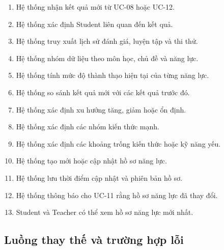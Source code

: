 \begin{enumerate}
	\item Hệ thống nhận kết quả mới từ UC-08 hoặc UC-12.
	
	\item Hệ thống xác định Student liên quan đến kết quả.
	
	\item Hệ thống truy xuất lịch sử đánh giá, luyện tập và thi thử.
	
	\item Hệ thống nhóm dữ liệu theo môn học, chủ đề và năng lực.
	
	\item Hệ thống tính mức độ thành thạo hiện tại của từng năng lực.
	
	\item Hệ thống so sánh kết quả mới với các kết quả trước đó.
	
	\item Hệ thống xác định xu hướng tăng, giảm hoặc ổn định.
	
	\item Hệ thống xác định các nhóm kiến thức mạnh.
	
	\item Hệ thống xác định các khoảng trống kiến thức hoặc kỹ năng yếu.
	
	\item Hệ thống tạo mới hoặc cập nhật hồ sơ năng lực.
	
	\item Hệ thống lưu thời điểm cập nhật và phiên bản hồ sơ.
	
	\item Hệ thống thông báo cho UC-11 rằng hồ sơ năng lực đã thay đổi.
	
	\item Student và Teacher có thể xem hồ sơ năng lực mới nhất.
\end{enumerate}

\subsection{Luồng thay thế và trường hợp lỗi}

